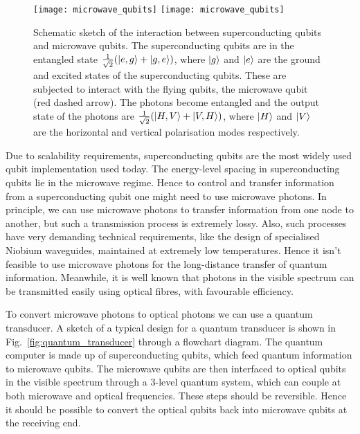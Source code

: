 \begin{figure}[!htbp]
\pubmode
	\texttt{[image: microwave\_qubits]}
\else
\texttt{[image: microwave\_qubits]}
\fi
\captionspacefig \caption{Schematic sketch of the interaction between superconducting qubits and microwave qubits. The superconducting qubits are in the entangled state \mbox{$\frac{1}{\sqrt{2}}(|e,g\rangle + |g,e\rangle)$}, where $|g\rangle$ and $|e\rangle$ are the ground and excited states of the superconducting qubits. These are subjected to interact with the flying qubits, the microwave qubit (red dashed arrow). The photons become entangled and the output state of the photons are \mbox{$\frac{1}{\sqrt{2}}(|H,V\rangle + |V,H\rangle)$}, where $|H\rangle$ and $|V\rangle$ are the horizontal and vertical polarisation modes respectively.}\label{fig:microwave_qubits}
\end{figure}


Due to scalability requirements, superconducting qubits are the most widely used qubit implementation used today. The energy-level spacing in superconducting qubits lie in the microwave regime. Hence to control and transfer information from a superconducting qubit one might need to use microwave photons. In principle, we can use microwave photons to transfer information from one node to another, but such a transmission process is extremely lossy. Also, such processes have very demanding technical requirements, like the design of specialised Niobium waveguides, maintained at extremely low temperatures. Hence it isn't feasible to use microwave photons for the long-distance transfer of quantum information. Meanwhile, it is well known that photons in the visible spectrum can be transmitted easily using optical fibres, with favourable efficiency.

To convert microwave photons to optical photons we can use a quantum transducer. A sketch of a typical design for a quantum transducer is shown in Fig.~\ref{fig:quantum_transducer} through a flowchart diagram. The quantum computer is made up of superconducting qubits, which feed quantum information to microwave qubits. The microwave qubits are then interfaced to optical qubits in the visible spectrum through a 3-level quantum system, which can couple at both microwave and optical frequencies. These steps should be reversible. Hence it should be possible to convert the optical qubits back into microwave qubits at the receiving end. 

